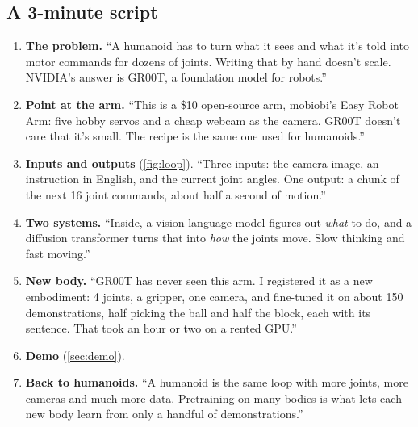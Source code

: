 \documentclass[11pt]{article}
\begin{document}
\subsection{A 3-minute script}

\begin{say}
\begin{enumerate}[leftmargin=*]
\item \textbf{The problem.} ``A humanoid has to turn what it sees and what it's told into
  motor commands for dozens of joints. Writing that by hand doesn't scale. NVIDIA's answer is
  GR00T, a foundation model for robots.''
\item \textbf{Point at the arm.} ``This is a \$10 open-source arm, mobiobi's Easy Robot Arm: five hobby servos and a cheap webcam as
  the camera. GR00T doesn't care that it's small. The recipe is the same one used for humanoids.''
\item \textbf{Inputs and outputs} (\cref{fig:loop}). ``Three inputs: the camera image, an
  instruction in English, and the current joint angles. One output: a chunk of the next
  16 joint commands, about half a second of motion.''
\item \textbf{Two systems.} ``Inside, a vision-language model figures out \emph{what} to do,
  and a diffusion transformer turns that into \emph{how} the joints move. Slow thinking and
  fast moving.''
\item \textbf{New body.} ``GR00T has never seen this arm. I registered it as a new embodiment:
  4 joints, a gripper, one camera, and fine-tuned it on about 150 demonstrations, half picking
  the ball and half the block, each with its sentence. That took
  an hour or two on a rented GPU.''
\item \textbf{Demo} (\cref{sec:demo}).
\item \textbf{Back to humanoids.} ``A humanoid is the same loop with more joints, more cameras
  and much more data. Pretraining on many bodies is what lets each new body learn from only a
  handful of demonstrations.''
\end{enumerate}
\end{say}
\end{document}
